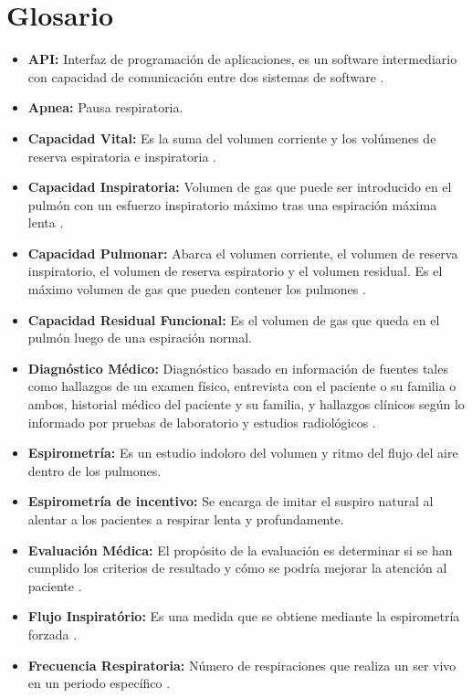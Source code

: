 \documentclass[12pt]{article}
\begin{document}
\section{Glosario}
\begin{itemize}

\item \textbf{API:} Interfaz de programación de aplicaciones, es un software intermediario con capacidad de comunicación entre dos sistemas de software \cite{48}.
\item \textbf{Apnea:} Pausa respiratoria.
\item \textbf{Capacidad Vital:} Es la suma del volumen corriente y los volúmenes de reserva espiratoria e inspiratoria \cite{19}. 
\item \textbf{Capacidad Inspiratoria:} Volumen de gas que puede ser introducido en el pulmón con un esfuerzo inspiratorio máximo tras una espiración máxima lenta \cite{19}.
\item \textbf{Capacidad Pulmonar:} Abarca el volumen corriente, el volumen de reserva inspiratorio, el volumen de reserva espiratorio y el volumen residual. Es el máximo volumen de gas que pueden contener los pulmones \cite{19}.
\item \textbf{Capacidad Residual Funcional:} Es el volumen de gas que queda en el pulmón luego de una espiración normal\cite{19}.
\item \textbf{Diagnóstico Médico:} Diagnóstico basado en información de fuentes tales como hallazgos de un examen físico, entrevista con el paciente o su familia o ambos, historial médico del paciente y su familia, y hallazgos clínicos según lo informado por pruebas de laboratorio y estudios radiológicos \cite{4}.
\item \textbf{Espirometría:} Es un estudio indoloro del volumen y ritmo del flujo del aire dentro de los pulmones.
\item \textbf{Espirometría de incentivo:} Se encarga de imitar el suspiro natural al alentar a los pacientes a respirar lenta y profundamente.
\item \textbf{Evaluación Médica:} El propósito de la evaluación es determinar si se han cumplido los criterios de resultado y cómo se podría mejorar la atención al paciente \cite{4}.

\item \textbf{Flujo Inspiratório:} Es una medida que se obtiene mediante la espirometría forzada \cite{49}.


\item \textbf{Frecuencia Respiratoria:} Número de respiraciones que realiza un ser vivo en un periodo específico \cite{1}. 




\end{itemize}
\end{document}
